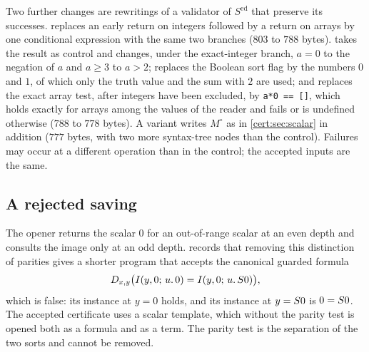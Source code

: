 Two further changes are rewritings of a validator of $S^{\mathrm{ed}}$ that
preserve its successes.  replaces an early return on
integers followed by a return on arrays by one conditional expression with
the same two branches ($803$ to $788$ bytes).  takes the
result as control and changes, under the exact-integer branch, $a=0$ to the
negation of $a$ and $a\ge 3$ to $a>2$; replaces the Boolean sort flag by the
numbers $0$ and $1$, of which only the truth value and the sum with $2$ are
used; and replaces the exact array test, after integers have been excluded,
by \texttt{a*0 == []}, which holds exactly for arrays among the values of the
reader and fails or is undefined otherwise ($788$ to $778$ bytes). A variant
writes $M^{\circ}$ as in \cref{cert:sec:scalar} in addition ($777$ bytes, with
two more syntax-tree nodes than the control). Failures may occur at a
different operation than in the control; the accepted inputs are the same.

\subsection{A rejected saving}

The opener returns the scalar $0$ for an out-of-range scalar at an even depth
and consults the image only at an odd depth.  records that
removing this distinction of parities gives a shorter program that accepts
the canonical guarded formula
\[
D_{x,y}\bigl(I(y,0;\,u.\,0)=I(y,0;\,u.\,S 0)\bigr),
\]
which is false: its instance at $y=0$ holds, and its instance at $y=S 0$
is $0=S 0$. The accepted certificate uses a scalar template, which without
the parity test is opened both as a formula and as a term. The parity test
is the separation of the two sorts and cannot be removed.

